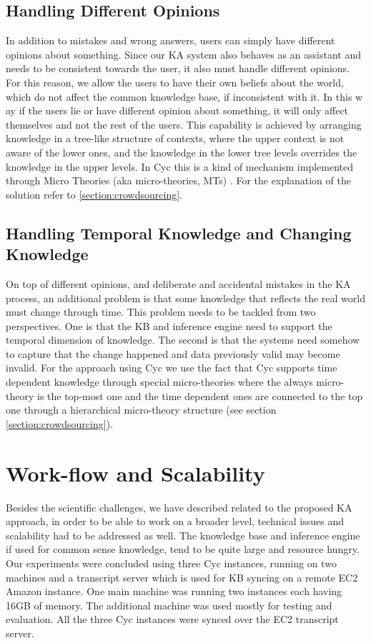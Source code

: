 \subsection{Handling Different Opinions}
In addition to mistakes and wrong answers, users can simply have different 
opinions about something. Since our KA system also behaves as an assistant and 
needs to be consistent towards the user, it also must handle different opinions. 
For this reason, we allow the users to have their own beliefs about the world, 
which do not affect the common knowledge base, if inconsistent with it. In this w
ay if the users lie or have different opinion about something, it will only 
affect themselves and not the rest of the users. This capability is achieved by 
arranging knowledge in a tree-like structure of contexts, where the upper 
context is not aware of the lower ones, and the knowledge in the lower tree 
levels overrides the knowledge in the upper levels. In Cyc this is a kind of 
mechanism implemented through Micro Theories (aka micro-theories, MTs)
\parencite{Kleer2013}. For the explanation of the solution refer to 
\autoref{section:crowdsourcing}. 

\subsection{Handling Temporal Knowledge and Changing Knowledge}
On top of different opinions, and deliberate and accidental mistakes in the 
KA process, an additional problem is that some knowledge that reflects the real 
world must change through time. This problem needs to be tackled from two 
perspectives. One is that the KB and inference engine need to support the 
temporal dimension of knowledge. The second is that the systems need somehow to 
capture that the change happened and data previously valid may become invalid. 
For the approach using Cyc we use the fact that Cyc supports time dependent 
knowledge through special micro-theories where the always micro-theory is the 
top-most one and the time dependent ones are connected to the top one through 
a hierarchical micro-theory structure (see section \ref{section:crowdsourcing}). 

\section{Work-flow and Scalability}
Besides the scientific challenges, we have described related to the proposed 
KA approach, in order to be able to work on a broader level, technical issues 
and scalability had to be addressed as well. The knowledge base and inference 
engine if used for common sense knowledge, tend to be quite large and resource 
hungry. Our experiments were concluded using three Cyc instances, running on 
two machines and a transcript server which is used for KB syncing on a remote 
EC2 Amazon instance. One main machine was running two instances each having 
16GB of memory. The additional machine was used mostly for testing and 
evaluation. All the three Cyc instances were synced over the EC2 
transcript server.

